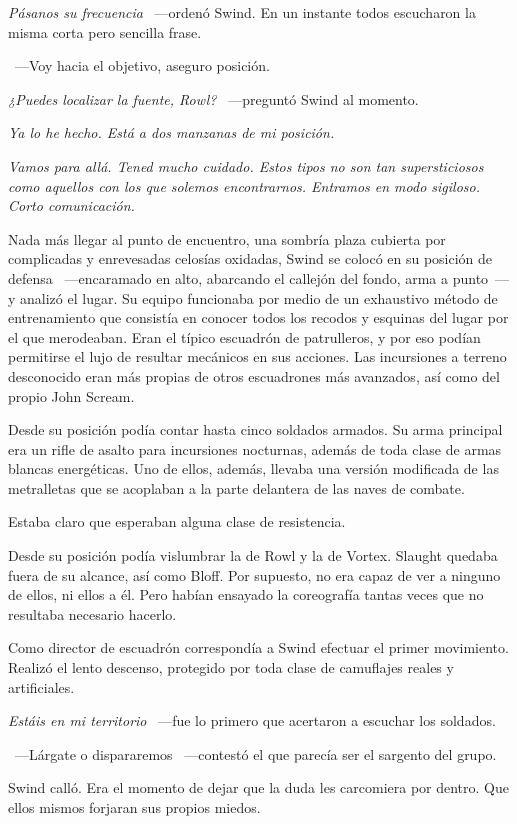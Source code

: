 \emph{Pásanos su frecuencia} ~---ordenó Swind. En un instante todos escucharon la misma corta pero sencilla frase.

~---Voy hacia el objetivo, aseguro posición.

\emph{¿Puedes localizar la fuente, Rowl?} ~---preguntó Swind al momento.

\emph{Ya lo he hecho. Está a dos manzanas de mi posición.}

\emph{Vamos para allá. Tened mucho cuidado. Estos tipos no son tan supersticiosos como aquellos con los que solemos encontrarnos. Entramos en modo sigiloso. Corto comunicación.}

Nada más llegar al punto de encuentro, una sombría plaza cubierta por complicadas y enrevesadas celosías oxidadas, Swind se colocó en su posición de defensa ~---encaramado en alto, abarcando el callejón del fondo, arma a punto~--- y analizó el lugar. Su equipo funcionaba por medio de un exhaustivo método de entrenamiento que consistía en conocer todos los recodos y esquinas del lugar por el que merodeaban. Eran el típico escuadrón de patrulleros, y por eso podían permitirse el lujo de resultar mecánicos en sus acciones. Las incursiones a terreno desconocido eran más propias de otros escuadrones más avanzados, así como del propio John Scream.

Desde su posición podía contar hasta cinco soldados armados. Su arma principal era un rifle de asalto para incursiones nocturnas, además de toda clase de armas blancas energéticas. Uno de ellos, además, llevaba una versión modificada de las metralletas que se acoplaban a la parte delantera de las naves de combate.

Estaba claro que esperaban alguna clase de resistencia.

Desde su posición podía vislumbrar la de Rowl y la de Vortex. Slaught quedaba fuera de su alcance, así como Bloff. Por supuesto, no era capaz de ver a ninguno de ellos, ni ellos a él. Pero habían ensayado la coreografía tantas veces que no resultaba necesario hacerlo.

Como director de escuadrón correspondía a Swind efectuar el primer movimiento. Realizó el lento descenso, protegido por toda clase de camuflajes reales y artificiales.

\emph{Estáis en mi territorio} ~---fue lo primero que acertaron a escuchar los soldados.

~---Lárgate o dispararemos ~---contestó el que parecía ser el sargento del grupo.

Swind calló. Era el momento de dejar que la duda les carcomiera por dentro. Que ellos mismos forjaran sus propios miedos.

